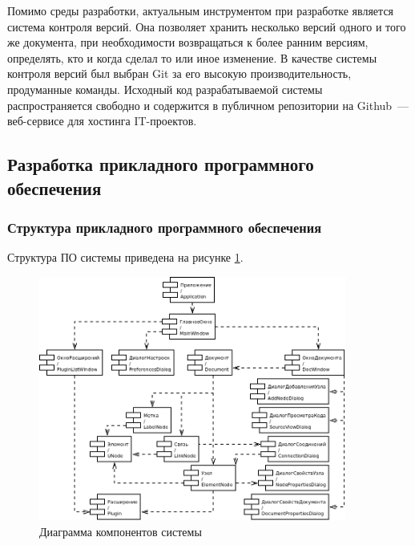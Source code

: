 Помимо среды разработки, актуальным инструментом при разработке является система контроля версий.
Она позволяет хранить несколько версий одного и того же документа, при необходимости возвращаться к более ранним версиям, определять, кто и когда сделал то или иное изменение.
В качестве системы контроля версий был выбран Git за его высокую производительность, продуманные команды.
Исходный код разрабатываемой системы распространяется свободно и содержится в публичном репозитории на Github~--- веб-сервисе для хостинга IT-проектов.


\subsection{Разработка прикладного программного обеспечения}

\subsubsection{Структура прикладного программного обеспечения}

Структура ПО системы приведена на рисунке \ref{fig:components-big}.
\begin{figure}[H]
  \centering
  \includegraphics[width=0.9\textwidth]{diagrams/uml.png}
  \caption{Диаграмма компонентов системы}
  \label{fig:components-big}
\end{figure}

